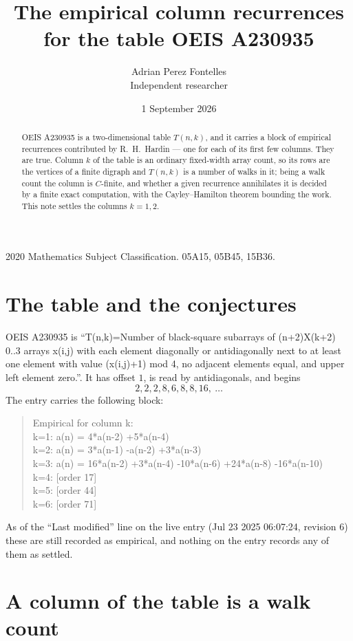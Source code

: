 \documentclass[11pt,a4paper]{article}
\title{The empirical column recurrences for the table OEIS A230935}
\author{Adrian Perez Fontelles\\ \small Independent researcher}
\date{1 September 2026}
\theoremstyle{plain}
\theoremstyle{definition}
\begin{document}
\maketitle

\begin{abstract}
OEIS A230935 is a two-dimensional table $T(n,k)$, and it carries a block of empirical
recurrences contributed by R.~H.~Hardin --- one for each of its first few columns. They are
true. Column $k$ of the table is an ordinary fixed-width array count, so its rows are the
vertices of a finite digraph and $T(n,k)$ is a number of walks in it; being a walk count the
column is $C$-finite, and whether a given recurrence annihilates it is decided by a finite
exact computation, with the Cayley--Hamilton theorem bounding the work. This note settles the columns $k=1, 2$.
\end{abstract}

\noindent\small 2020 Mathematics Subject Classification. 05A15, 05B45, 15B36.\normalsize

\section{The table and the conjectures}

OEIS A230935 is ``T(n,k)=Number of black-square subarrays of (n+2)X(k+2) 0..3 arrays x(i,j) with each element diagonally or antidiagonally next to at least one element with value (x(i,j)+1) mod 4, no adjacent elements equal, and upper left element zero.''. It has offset $1$, is
read by antidiagonals, and begins
\[
2, 2, 2, 8, 6, 8, 8, 16,\ \dots
\]
The entry carries the following block:
\begin{quote}\small
Empirical for column k:\\
k=1: a(n) = 4*a(n-2) +5*a(n-4)\\
k=2: a(n) = 3*a(n-1) -a(n-2) +3*a(n-3)\\
k=3: a(n) = 16*a(n-2) +3*a(n-4) -10*a(n-6) +24*a(n-8) -16*a(n-10)\\
k=4: [order 17]\\
k=5: [order 44]\\
k=6: [order 71]\\
\end{quote}
As of the ``Last modified'' line on the live entry (Jul 23 2025 06:07:24, revision 6) these are still
recorded as empirical, and nothing on the entry records any of them as settled.

\section{A column of the table is a walk count}
\end{document}
